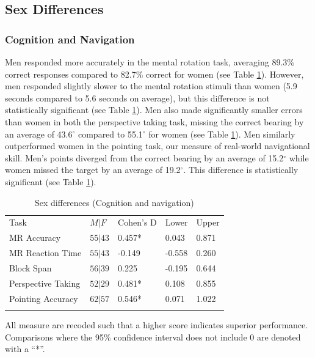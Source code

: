 	\subsection{Sex Differences}
	\label{sec:3.1}
		\subsubsection{Cognition and Navigation}		
		\label{sec:3.1.1}
Men responded more accurately in the mental rotation task, averaging 89.3\% correct responses compared to 82.7\% correct for women (see Table \ref{tab:sd_cog}).  However, men responded slightly slower to the mental rotation stimuli than women (5.9 seconds compared to 5.6 seconds on average), but this difference is not statistically significant (see Table \ref{tab:sd_cog}).  Men also made significantly smaller errors than women in both the perspective taking task, missing the correct bearing by an average of 43.6$^{\circ}$ compared to 55.1$^{\circ}$ for women (see Table \ref{tab:sd_cog}).  Men similarly outperformed women in the pointing task, our measure of real-world navigational skill.  Men's points diverged from the correct bearing by an average of 15.2$^{\circ}$ while women missed the target by an average of 19.2$^{\circ}$.  This difference is statistically significant (see Table \ref{tab:sd_cog}).

\begin{table}[h!]
\caption{Sex differences (Cognition and navigation)}
\label{tab:sd_cog}  
\begin{tabular}{lllll}
\hline\noalign{\smallskip}
Task & $M|F$ & Cohen's D & Lower & Upper  \\
\noalign{\smallskip}\hline\noalign{\smallskip}
MR Accuracy & $55|43$ & \phantom{-}0.457* & \phantom{-}0.043 & \phantom{-}0.871 \\
MR Reaction Time & $55|43$ & -0.149 & -0.558 & \phantom{-}0.260 \\
Block Span & $56|39$ & \phantom{-}0.225 & -0.195 & \phantom{-}0.644 \\
Perspective Taking & $52|29$ & \phantom{-}0.481* & \phantom{-}0.108 & \phantom{-}0.855 \\
Pointing Accuracy & $62|57$ & \phantom{-}0.546* & \phantom{-}0.071 & \phantom{-}1.022 \\
\noalign{\smallskip}\hline
\end{tabular}\par
\bigskip
All measure are recoded such that a higher score indicates superior performance.  Comparisons where the 95\% confidence interval does not include 0 are denoted with a ``*''.
\end{table}

